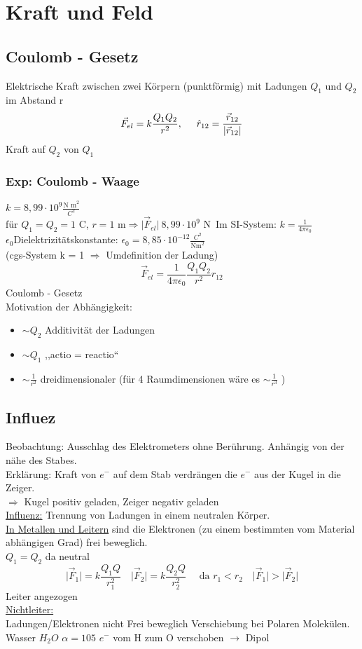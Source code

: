 \documentclass[titlepage,12pt,a4paper,ngerman]{report}
\newcommand{\tx}[1]{\textrm{#1}}
\begin{document}
\section{Kraft und Feld}
\subsection{Coulomb - Gesetz}
Elektrische Kraft zwischen zwei Körpern (punktförmig) mit Ladungen $Q_1$ und $Q_2$ im Abstand r
$$\vec{F}_{el} = k \frac{Q_1 Q_2}{r^2} , \hspace{0.5cm}\hat{r}_{12} = \frac{\vec{r}_{12}}{\vert\vec{r}_{12} \vert }$$
Kraft auf $Q_2$ von $Q_1$ 
\subsubsection*{Exp: Coulomb - Waage}
$k = 8,99 \cdot 10^{9} \frac{\tx{N m}^2}{C^2}$\\
für $Q_1 = Q_2  =1\tx{ C}$, $r =1\tx { m} \Rightarrow \vert \vec{F}_{el} \vert\  8,99 \cdot 10^{9} \tx{ N}$\
Im SI-System: $k = \frac{1}{4 \pi \epsilon_0}$\\
$\epsilon_0$Dielektrizitätskonstante: $\epsilon_0 = 8,85 \cdot 10^{-12} \frac{C^2}{\tx{Nm}^2}$\\
(cgs-System k = 1 $\Rightarrow$ Umdefinition der Ladung)
$$\vec{F}_{el} = \frac{1}{4 \pi \epsilon_0 } \frac{Q_1 Q_2}{r^2}\hat{r}_{12}$$ Coulomb - Gesetz\\
Motivation der Abhängigkeit:
\begin{itemize}
\item $\sim Q_2$ Additivität der Ladungen
\item $\sim Q_1$ ,,actio = reactio``
\item $\sim \frac{1}{r^2}$ dreidimensionaler (für 4 Raumdimensionen wäre es $\sim \frac{1}{r^3}$ )
\end{itemize}

\subsection{Influez}
Beobachtung: Ausschlag des Elektrometers ohne Berührung. Anhängig von der nähe des Stabes.\\
Erklärung: Kraft von $e^-$ auf dem Stab verdrängen die $e^-$ aus der Kugel in die Zeiger.\\
$\Rightarrow$ Kugel positiv geladen, Zeiger negativ geladen\\[5pt]
\underline{Influenz:} Trennung von Ladungen in einem neutralen Körper.\\[5pt]
\underline{In Metallen und Leitern} sind die Elektronen (zu einem bestimmten vom Material abhängigen Grad) frei beweglich.\\
$Q_1 = Q_2$ da neutral
$$\vert \vec{F}_1 \vert = k \frac{Q_1 Q}{r_1^2} \quad \vert \vec{F}_2 \vert = k \frac{Q_2 Q}{r_2^2}\quad  \tx{ da } r_1 < r_2 \quad \vert \vec{F}_1 \vert > \vert \vec{F}_2 \vert$$ Leiter angezogen\\[5pt]
\underline{Nichtleiter:} \\
Ladungen/Elektronen nicht Frei beweglich Verschiebung bei Polaren Molekülen. Wasser $H_2 O$ $\alpha = 105$ $e^-$ vom H zum O verschoben $\rightarrow$ Dipol\\
\end{document}
